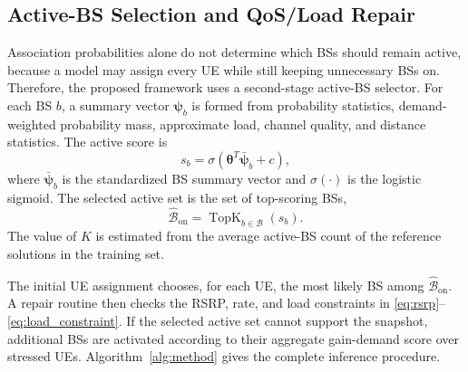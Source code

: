 \documentclass[journal]{IEEEtran}
\begin{document}
\subsection{Active-BS Selection and QoS/Load Repair}
Association probabilities alone do not determine which BSs should remain
active, because a model may assign every UE while still keeping unnecessary BSs
on. Therefore, the proposed framework uses a second-stage active-BS selector.
For each BS $b$, a summary vector $\boldsymbol{\psi}_b$ is formed from
probability statistics, demand-weighted probability mass, approximate load,
channel quality, and distance statistics. The active score is
\begin{equation}
    s_b = \sigma\left(\boldsymbol{\theta}^{T}
    \bar{\boldsymbol{\psi}}_b + c\right),
    \label{eq:active_score}
\end{equation}
where $\bar{\boldsymbol{\psi}}_b$ is the standardized BS summary vector and
$\sigma(\cdot)$ is the logistic sigmoid. The selected active set is the set of
top-scoring BSs,
\begin{equation}
    \widehat{\mathcal{B}}_{\mathrm{on}}
    = \operatorname{TopK}_{b\in\mathcal{B}}(s_b).
    \label{eq:topk}
\end{equation}
The value of $K$ is estimated from the average active-BS count of the reference
solutions in the training set.

The initial UE assignment chooses, for each UE, the most likely BS among
$\widehat{\mathcal{B}}_{\mathrm{on}}$. A repair routine then checks the RSRP,
rate, and load constraints in \eqref{eq:rsrp}--\eqref{eq:load_constraint}. If
the selected active set cannot support the snapshot, additional BSs are
activated according to their aggregate gain-demand score over stressed UEs.
Algorithm~\ref{alg:method} gives the complete inference procedure.
\end{document}
